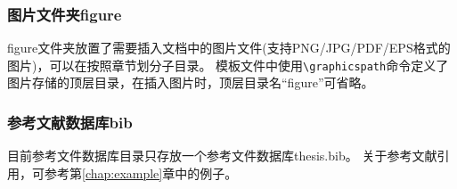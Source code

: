 \subsubsection{图片文件夹figure}
\label{sec:fig}

figure文件夹放置了需要插入文档中的图片文件(支持PNG/JPG/PDF/EPS格式的图片)，可以在按照章节划分子目录。
模板文件中使用\verb|\graphicspath|命令定义了图片存储的顶层目录，在插入图片时，顶层目录名“figure”可省略。

\subsubsection{参考文献数据库bib}
\label{sec:bib}

目前参考文件数据库目录只存放一个参考文件数据库thesis.bib。
关于参考文献引用，可参考第\ref{chap:example}章中的例子。

